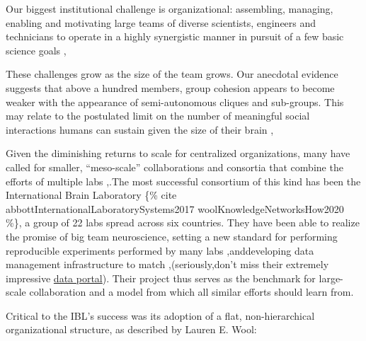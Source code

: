 \documentclass[nohyper]{tufte-book-jls}
\begin{document}
\begin{leftbar}
Our biggest institutional challenge is organizational: assembling,
managing, enabling and motivating large teams of diverse scientists,
engineers and technicians to operate in a highly synergistic manner in
pursuit of a few basic science goals \cite{grillnerWorldwideInitiativesAdvance2016},\end{leftbar}
\begin{leftbar}
These challenges grow as the size of the team grows. Our anecdotal
evidence suggests that above a hundred members, group cohesion appears
to become weaker with the appearance of semi-autonomous cliques and
sub-groups. This may relate to the postulated limit on the number of
meaningful social interactions humans can sustain given the size of
their brain \cite{kochBigScienceTeam2016},\end{leftbar}
Given the diminishing returns to scale for centralized organizations,
many have called for smaller, ``meso-scale'' collaborations and
consortia that combine the efforts of multiple labs \cite{mainenBetterWayCrack2016},.The most successful consortium of this
kind has been the International Brain Laboratory \{\% cite
abbottInternationalLaboratorySystems2017 woolKnowledgeNetworksHow2020
\%\}, a group of 22 labs spread across six countries. They have been
able to realize the promise of big team neuroscience, setting a new
standard for performing reproducible experiments performed by many labs
\cite{laboratoryStandardizedReproducibleMeasurement2020},anddeveloping data management infrastructure to match \cite{laboratoryDataArchitectureLargescale2020},(seriously,don't miss
their extremely impressive
\href{https://data.internationalbrainlab.org/}{data portal}). Their
project thus serves as the benchmark for large-scale collaboration and a
model from which all similar efforts should learn from.

Critical to the IBL's success was its adoption of a flat,
non-hierarchical organizational structure, as described by Lauren E.
Wool:
\end{document}

